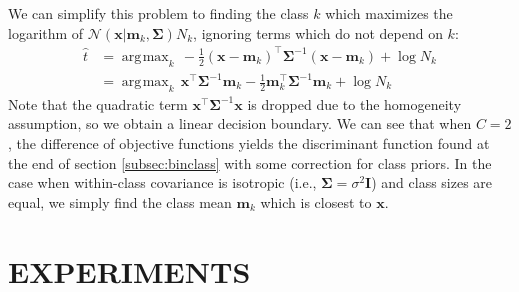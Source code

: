 \documentclass[letterpaper, 10 pt, conference]{ieeeconf}  %
\DeclareMathOperator*{\argmax}{\arg\!\max}
\newcommand{\ve}[1]{\mathbf{#1}}
\begin{document}
We can simplify this problem to finding the class $k$ which maximizes the logarithm of $\mathcal{N}(\ve{x} | \ve{m}_k, \ve{\Sigma}) N_k$, ignoring terms which do not depend on $k$:
\begin{align*} 
    \hat{t} &= \argmax_{k} \, -\frac{1}{2}(\ve{x} - \ve{m}_k)^{\top}\ve{\Sigma}^{-1}(\ve{x} - \ve{m}_k) + \log N_k 
    \\ &= \argmax_{k} \, \ve{x}^{\top}\ve{\Sigma}^{-1}\ve{m}_k - \frac{1}{2}\ve{m}_k^{\top}\ve{\Sigma}^{-1}\ve{m}_k + \log N_k
\end{align*}
Note that the quadratic term $\ve{x}^{\top}\ve{\Sigma}^{-1}\ve{x}$ is dropped due to the homogeneity assumption, so we obtain a linear decision boundary. We can see that when $C=2$, the difference of objective functions yields the  discriminant function found at the end of section \ref{subsec:binclass} with some correction for class priors.
In the case when within-class covariance is isotropic (i.e., $\ve{\Sigma} = \sigma^2\ve{I}$) and class sizes are equal, we simply find the class mean $\ve{m}_k$ which is closest to $\ve{x}$.




\section{EXPERIMENTS}\label{sec:experiments}
\end{document}
